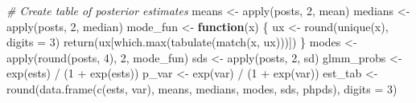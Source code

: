 \documentclass[12pt]{article}
\newenvironment{Shaded}{\begin{snugshade}}{\end{snugshade}}
\newcommand{\AttributeTok}[1]{\textcolor[rgb]{0.77,0.63,0.00}{#1}}
\newcommand{\CommentTok}[1]{\textcolor[rgb]{0.56,0.35,0.01}{\textit{#1}}}
\newcommand{\ControlFlowTok}[1]{\textcolor[rgb]{0.13,0.29,0.53}{\textbf{#1}}}
\newcommand{\DecValTok}[1]{\textcolor[rgb]{0.00,0.00,0.81}{#1}}
\newcommand{\FunctionTok}[1]{\textcolor[rgb]{0.00,0.00,0.00}{#1}}
\newcommand{\NormalTok}[1]{#1}
\newcommand{\OtherTok}[1]{\textcolor[rgb]{0.56,0.35,0.01}{#1}}
\newcommand{\SpecialCharTok}[1]{\textcolor[rgb]{0.00,0.00,0.00}{#1}}
\begin{document}
\begin{Shaded}
\begin{Highlighting}[]
\CommentTok{\# Create table of posterior estimates}
\NormalTok{means }\OtherTok{\textless{}{-}} \FunctionTok{apply}\NormalTok{(posts, }\DecValTok{2}\NormalTok{, mean)}
\NormalTok{medians }\OtherTok{\textless{}{-}} \FunctionTok{apply}\NormalTok{(posts, }\DecValTok{2}\NormalTok{, median)}
\NormalTok{mode\_fun }\OtherTok{\textless{}{-}} \ControlFlowTok{function}\NormalTok{(x) \{}
\NormalTok{  ux }\OtherTok{\textless{}{-}} \FunctionTok{round}\NormalTok{(}\FunctionTok{unique}\NormalTok{(x), }\AttributeTok{digits =} \DecValTok{3}\NormalTok{)}
  \FunctionTok{return}\NormalTok{(ux[}\FunctionTok{which.max}\NormalTok{(}\FunctionTok{tabulate}\NormalTok{(}\FunctionTok{match}\NormalTok{(x, ux)))])}
\NormalTok{\}}
\NormalTok{modes }\OtherTok{\textless{}{-}} \FunctionTok{apply}\NormalTok{(}\FunctionTok{round}\NormalTok{(posts, }\DecValTok{4}\NormalTok{), }\DecValTok{2}\NormalTok{, mode\_fun)}
\NormalTok{sds }\OtherTok{\textless{}{-}} \FunctionTok{apply}\NormalTok{(posts, }\DecValTok{2}\NormalTok{, sd)}
\NormalTok{glmm\_probs }\OtherTok{\textless{}{-}} \FunctionTok{exp}\NormalTok{(ests) }\SpecialCharTok{/}\NormalTok{ (}\DecValTok{1} \SpecialCharTok{+} \FunctionTok{exp}\NormalTok{(ests))}
\NormalTok{p\_var }\OtherTok{\textless{}{-}} \FunctionTok{exp}\NormalTok{(var) }\SpecialCharTok{/}\NormalTok{ (}\DecValTok{1} \SpecialCharTok{+} \FunctionTok{exp}\NormalTok{(var))}
\NormalTok{est\_tab }\OtherTok{\textless{}{-}} \FunctionTok{round}\NormalTok{(}\FunctionTok{data.frame}\NormalTok{(}\FunctionTok{c}\NormalTok{(ests, var), means, medians, modes, sds, phpds), }\AttributeTok{digits =} \DecValTok{3}\NormalTok{)}


\end{Highlighting}
\end{Shaded}
\end{document}
